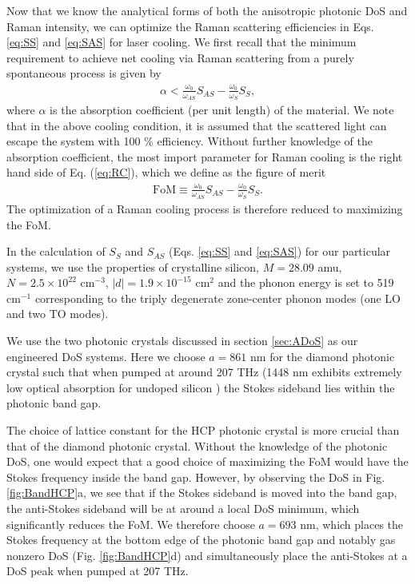 \documentclass[%
 reprint,
superscriptaddress,
 amsmath,amssymb,
 aps,
pra,
]{revtex4-1}
\begin{document}
Now that we know the analytical forms of both the anisotropic photonic DoS and Raman intensity, we can optimize the Raman scattering efficiencies in Eqs. \ref{eq:SS} and \ref{eq:SAS} for laser cooling. We first recall that the minimum requirement to achieve net cooling via Raman scattering from a purely spontaneous process is given by \cite{chen2015raman}
\begin{align}\label{eq:RC}
\alpha<\frac{\omega_0}{\omega_{AS}}S_{AS}-\frac{\omega_0}{\omega_{S}}S_{S},
\end{align}
where $\alpha$ is the absorption coefficient (per unit length) of the material. We note that in the above cooling condition, it is assumed that the scattered light can escape the system with 100 \% efficiency. Without further knowledge of the absorption coefficient, the most import parameter for Raman cooling is the right hand side of Eq. (\ref{eq:RC}), which we define as the figure of merit 
\begin{align}\label{eq:FoM}
\text{FoM}\equiv \frac{\omega_0}{\omega_{AS}}S_{AS}-\frac{\omega_0}{\omega_{S}}S_{S}.
\end{align}
The optimization of a Raman cooling process is therefore reduced to maximizing the FoM. 





In the calculation of $S_S$ and $S_{AS}$ (Eqs. \ref{eq:SS} and \ref{eq:SAS}) for our particular systems, we use the properties of crystalline silicon, $M= 28.09$ amu, $N=2.5\times 10^{22}$ cm$^{-3}$, $|d|=1.9\times 10^{-15}$ cm$^{2}$ and the phonon energy is set to 519 cm$^{-1}$ \cite{aggarwal2011measurement} corresponding to the triply degenerate zone-center phonon modes (one LO and two TO modes).

We use the two photonic crystals discussed in section \ref{sec:ADoS} as our engineered DoS systems. Here we choose $a=861$ nm for the diamond photonic crystal such that when pumped at around 207 THz (1448 nm exhibits extremely low optical absorption for undoped silicon \cite{green2008self}) the Stokes sideband lies within the photonic band gap.





The choice of lattice constant for the HCP photonic crystal is more crucial than that of the diamond photonic crystal.
Without the knowledge of the photonic DoS, one would expect that a good choice of maximizing the FoM would have the Stokes frequency inside the band gap. However, by observing the DoS in Fig. \ref{fig:BandHCP}a, we see that if the Stokes sideband is moved into the band gap, the anti-Stokes sideband will be at around a local DoS minimum, which significantly reduces the FoM. We therefore choose $a=693$ nm, which places the Stokes frequency at the bottom edge of the photonic band gap and notably gas nonzero DoS (Fig. \ref{fig:BandHCP}d) and simultaneously place the anti-Stokes at a DoS peak when pumped at 207 THz.
\end{document}
